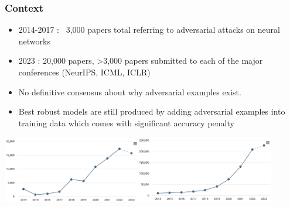 \begin{frame}
  \frametitle{Context}
  \begin{itemize}
    \item 2014-2017 : ~3,000 papers total referring to adversarial attacks on
      neural networks
    \item 2023 : 20,000 papers, >3,000 papers submitted to each of the
      major conferences (NeurIPS, ICML, ICLR)
      \item No definitive consensus about why adversarial examples
        exist.
        \item Best robust models are still produced by adding
          adversarial examples into training data which comes with significant
          accuracy penalty 
\end{itemize} \includegraphics[width=0.45\textwidth]{s1.png}\includegraphics[width=0.45\textwidth]{s2.png}
  \end{frame}


